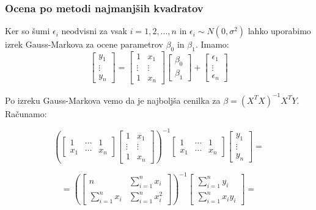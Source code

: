 \documentclass{article}
\begin{document}
\subsubsection*{Ocena po metodi najmanjših kvadratov}
Ker so šumi $\epsilon_i$ neodvisni za vsak $i = 1,2,...,n$ in $\epsilon_i \sim N(0,\sigma^2)$ lahko uporabimo izrek Gauss-Markova za ocene parametrov $\beta_0$ in $\beta_1$.
Imamo:
\begin{equation*}
\begin{bmatrix}
y_1\\
\vdots\\
y_n
\end{bmatrix}
=
\begin{bmatrix}
1 & x_1\\
\vdots &\vdots \\
1 & x_n
\end{bmatrix}
\begin{bmatrix}
\beta_0\\
\beta_1
\end{bmatrix}
+
\begin{bmatrix}
\epsilon_1\\
\vdots\\
\epsilon_n
\end{bmatrix}
\end{equation*}

Po izreku Gauss-Markova vemo da je najboljša cenilka za $\beta = (X^TX)^{-1}X^TY$. Računamo:

\begin{equation*}
\left(
\begin{bmatrix}
1 & \cdots & 1\\
x_1 & \cdots & x_n
\end{bmatrix}
\begin{bmatrix}
1 & x_1\\
\vdots &\vdots \\
1 & x_n
\end{bmatrix}
\right)^{-1}
\begin{bmatrix}
1 & \cdots & 1\\
x_1 & \cdots & x_n
\end{bmatrix}
\begin{bmatrix}
y_1\\
\vdots\\
y_n
\end{bmatrix}
=
\end{equation*}

\begin{equation*}
=
\left(
\begin{bmatrix}
n & \sum_{i=1}^nx_i\\
\sum_{i=1}^nx_i & \sum_{i=1}^nx_i^2
\end{bmatrix}
\right)^{-1}
\begin{bmatrix}
\sum_{i=1}^ny_i\\
\sum_{i=1}^nx_iy_i
\end{bmatrix}
=
\end{equation*}
\end{document}
